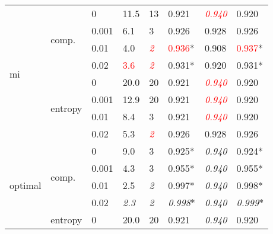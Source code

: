 \begin{table}[h]
\begin{tabularx}{\textwidth}{|X|X|X|X|X|X|X|X|}
		\multirow{8}{*}{mi}      & \multirow{4}{*}{comp.}   & 0         & 11.5          & 13               & 0.921          & \textcolor{red}{\textit{0.940}} & 0.920          \\ \cline{3-8} 
		&                          & 0.001     & 6.1           & 3                & 0.926          & 0.928                & 0.926          \\ \cline{3-8} 
		&                          & 0.01      & 4.0           & \textcolor{red}{\textit{2}} & \textcolor{red}{0.936}*    & 0.908                & \textcolor{red}{0.937}*    \\ \cline{3-8} 
		&                          & 0.02      & \textcolor{red}{3.6}     & \textcolor{red}{\textit{2}} & 0.931*          & 0.920                & 0.931*          \\ \cline{2-8} 
		& \multirow{4}{*}{entropy} & 0         & 20.0          & 20               & 0.921          & \textcolor{red}{\textit{0.940}} & 0.920          \\ \cline{3-8} 
		&                          & 0.001     & 12.9          & 20               & 0.921          & \textcolor{red}{\textit{0.940}} & 0.920          \\ \cline{3-8} 
		&                          & 0.01      & 8.4           & 3                & 0.921          & \textcolor{red}{\textit{0.940}} & 0.920          \\ \cline{3-8} 
		&                          & 0.02      & 5.3           & \textcolor{red}{\textit{2}} & 0.926          & 0.928                & 0.926          \\ \hline
		\multirow{8}{*}{optimal} & \multirow{4}{*}{comp.}   & 0         & 9.0           & 3                & 0.925*          & \textit{0.940}       & 0.924*          \\ \cline{3-8} 
		&                          & 0.001     & 4.3           & 3                & 0.955*          & \textit{0.940}       & 0.955*          \\ \cline{3-8} 
		&                          & 0.01      & 2.5           & \textit{2}       & 0.997*          & \textit{0.940}       & 0.998*          \\ \cline{3-8} 
		&                          & 0.02      & \textit{2.3}  & \textit{2}       & \textit{0.998}* & \textit{0.940}       & \textit{0.999}* \\ \cline{2-8} 
		& \multirow{4}{*}{entropy} & 0         & 20.0          & 20               & 0.921          & \textit{0.940}       & 0.920          \\ \cline{3-8} 

\end{tabularx}
\end{table}
